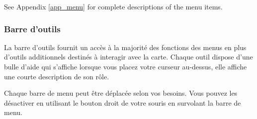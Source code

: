 
See Appendix \ref{app_menu} for complete descriptions of the menu items.

\subsubsection{Barre d'outils}\label{label_toolbars}

%

La barre d'outils fournit un acc\`es \`a la majorit\'e des fonctions des menus en plus d'outils additionnels destin\'es \`a interagir avec la carte. Chaque outil dispose d'une bulle d'aide qui s'affiche lorsque vous placez votre curseur au-dessus, elle affiche une courte description de son r\^ole.

Chaque barre de menu peut \^etre d\'eplac\'ee selon vos besoins. Vous pouvez les d\'esactiver en utilisant le bouton droit de votre souris en survolant la barre de menu.

%

